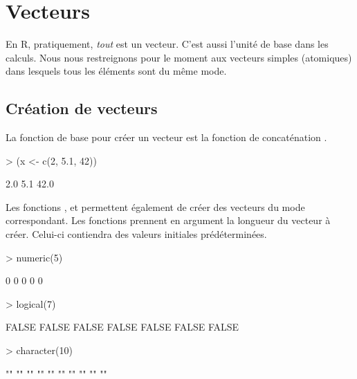 \section{Vecteurs}
\label{sec:premiers:vecteurs}

En R, pratiquement, \emph{tout} est un
vecteur. C'est aussi l'unité de base dans les calculs.
Nous nous restreignons pour le moment aux vecteurs simples (atomiques)
dans lesquels tous les éléments sont du même mode.

\subsection{Création de vecteurs}
\label{sec:premiers:vecteurs:creation}

La fonction de base pour créer un vecteur est la fonction de
concaténation .
\begin{Schunk}
\begin{Sinput}
> (x <- c(2, 5.1, 42))
\end{Sinput}
\begin{Soutput}
[1]  2.0  5.1 42.0
\end{Soutput}
\end{Schunk}

Les fonctions ,  et
 permettent également de créer des vecteurs du
mode correspondant. Les fonctions prennent en argument la longueur du
vecteur à créer. Celui-ci contiendra des valeurs initiales
prédéterminées.
\begin{Schunk}
\begin{Sinput}
> numeric(5)
\end{Sinput}
\begin{Soutput}
[1] 0 0 0 0 0
\end{Soutput}
\begin{Sinput}
> logical(7)
\end{Sinput}
\begin{Soutput}
[1] FALSE FALSE FALSE FALSE FALSE FALSE FALSE
\end{Soutput}
\begin{Sinput}
> character(10)
\end{Sinput}
\begin{Soutput}
 [1] "" "" "" "" "" "" "" "" "" ""
\end{Soutput}
\end{Schunk}

